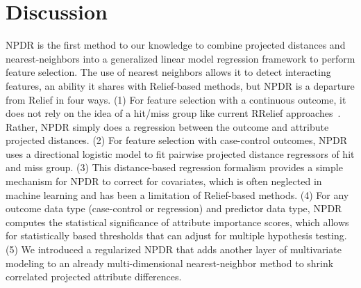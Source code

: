 \documentclass[10pt]{article}
\begin{document}

\section{Discussion}
NPDR is the first method to our knowledge to combine projected distances and nearest-neighbors into a generalized linear model regression framework to perform feature selection. The use of nearest neighbors allows it to detect interacting features, an ability it shares with Relief-based methods, but NPDR is a departure from Relief in four ways. (1) For feature selection with a continuous outcome, it does not rely on the idea of a hit/miss group like current RRelief approaches~\cite{urbanowicz17}. Rather, NPDR simply does a regression between the outcome and attribute projected distances. (2) For feature selection with case-control outcomes, NPDR uses a directional logistic model to fit pairwise projected distance regressors of hit and miss group. (3) This distance-based regression formalism provides a simple mechanism for NPDR to correct for covariates, which is often neglected in machine learning and has been a limitation of Relief-based methods. (4) For any outcome data type (case-control or regression) and predictor data type, NPDR computes the statistical significance of attribute importance scores, which allows for statistically based thresholds that can adjust for multiple hypothesis testing. (5) We introduced a regularized NPDR that adds another layer of multivariate modeling to an already multi-dimensional nearest-neighbor method to shrink correlated projected attribute differences.  
\end{document}

